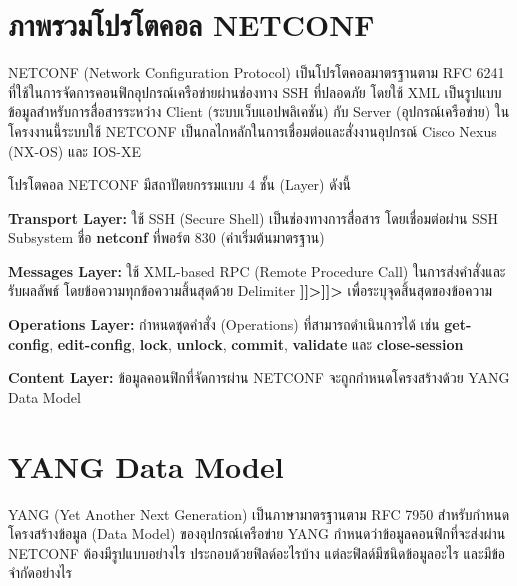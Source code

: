 \vspace*{-0.8in}

\section{ภาพรวมโปรโตคอล NETCONF}
\hspace*{1.3em}
NETCONF (Network Configuration Protocol) เป็นโปรโตคอลมาตรฐานตาม RFC 6241 ที่ใช้ในการจัดการคอนฟิกอุปกรณ์เครือข่ายผ่านช่องทาง SSH ที่ปลอดภัย โดยใช้ XML เป็นรูปแบบข้อมูลสำหรับการสื่อสารระหว่าง Client (ระบบเว็บแอปพลิเคชัน) กับ Server (อุปกรณ์เครือข่าย) ในโครงงานนี้ระบบใช้ NETCONF เป็นกลไกหลักในการเชื่อมต่อและสั่งงานอุปกรณ์ Cisco Nexus (NX-OS) และ IOS-XE

\hspace*{1.3em}
โปรโตคอล NETCONF มีสถาปัตยกรรมแบบ 4 ชั้น (Layer) ดังนี้

\begin{mycustomenum2}
    \item \textbf{Transport Layer:} ใช้ SSH (Secure Shell) เป็นช่องทางการสื่อสาร โดยเชื่อมต่อผ่าน SSH Subsystem ชื่อ \textbf{netconf} ที่พอร์ต 830 (ค่าเริ่มต้นมาตรฐาน)
    \item \textbf{Messages Layer:} ใช้ XML-based RPC (Remote Procedure Call) ในการส่งคำสั่งและรับผลลัพธ์ โดยข้อความทุกข้อความสิ้นสุดด้วย Delimiter \textbf{]]>]]>} เพื่อระบุจุดสิ้นสุดของข้อความ
    \item \textbf{Operations Layer:} กำหนดชุดคำสั่ง (Operations) ที่สามารถดำเนินการได้ เช่น \textbf{get-config}, \textbf{edit-config}, \textbf{lock}, \textbf{unlock}, \textbf{commit}, \textbf{validate} และ \textbf{close-session}
    \item \textbf{Content Layer:} ข้อมูลคอนฟิกที่จัดการผ่าน NETCONF จะถูกกำหนดโครงสร้างด้วย YANG Data Model
\end{mycustomenum2}

\section{YANG Data Model}
\hspace*{1.3em}
YANG (Yet Another Next Generation) เป็นภาษามาตรฐานตาม RFC 7950 สำหรับกำหนดโครงสร้างข้อมูล (Data Model) ของอุปกรณ์เครือข่าย YANG กำหนดว่าข้อมูลคอนฟิกที่จะส่งผ่าน NETCONF ต้องมีรูปแบบอย่างไร ประกอบด้วยฟิลด์อะไรบ้าง แต่ละฟิลด์มีชนิดข้อมูลอะไร และมีข้อจำกัดอย่างไร

